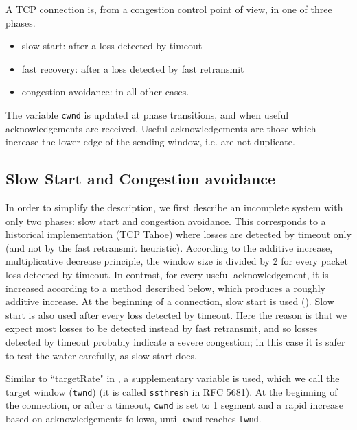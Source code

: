 A TCP connection is, from a congestion control point of view, in one
of three phases.

  \begin{itemize}
        \item  slow start: after a loss detected by timeout

        \item  fast recovery: after a loss detected by fast retransmit

        \item  congestion avoidance: in all other cases.
  \end{itemize}

The variable \texttt{cwnd} is updated at phase transitions, and when
useful acknowledgements are received. Useful acknowledgements are
those which increase the lower edge of the sending window, i.e. are
not duplicate.

\subsection{Slow Start and Congestion avoidance}

\begin{figure}[h]
        \protect\label{d32f1}
\end{figure}

In order to simplify the description, we first describe an
incomplete system with only two phases: slow start and congestion
avoidance.  This corresponds to a historical implementation (TCP
Tahoe) where losses are detected by timeout only (and not by the
fast retransmit heuristic).  According to the additive increase,
multiplicative decrease principle, the window size is divided by 2
for every packet loss detected by timeout. In contrast, for every
useful acknowledgement, it is increased according to a method
described below, which produces a roughly additive increase. At the
beginning of a connection, slow start is used (). Slow
start is also used after every loss detected by timeout. Here the
reason is that we expect most losses to be detected instead by fast
retransmit, and so losses detected by timeout probably indicate a
severe congestion; in this case it is safer to test the water
carefully, as slow start does.

Similar to ``targetRate" in , a supplementary variable
is used, which we call the target window (\texttt{twnd}) (it is
called \texttt{ssthresh} in RFC 5681).  At the beginning of the
connection, or after a timeout, \texttt{cwnd} is set to 1 segment
and a rapid increase based on acknowledgements follows, until
\texttt{cwnd} reaches \texttt{twnd}.

